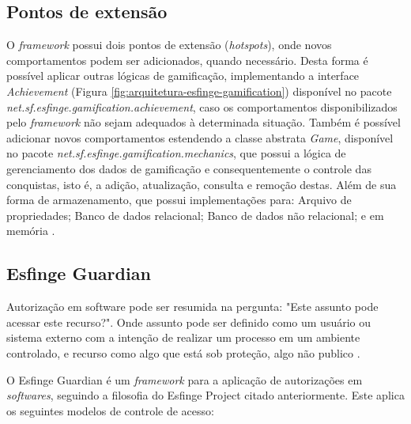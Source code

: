 \subsection{Pontos de extensão}

O \textit{framework} possui dois pontos de extensão (\textit{hotspots}), onde novos comportamentos podem ser adicionados, quando necessário. Desta forma é possível aplicar outras lógicas de gamificação, implementando a interface \textit{Achievement} (Figura \ref{fig:arquitetura-esfinge-gamification}) disponível no pacote \textit{net.sf.esfinge.gamification.achievement}, caso os comportamentos disponibilizados pelo \textit{framework} não sejam adequados \`a determinada situação. Também é possível adicionar novos comportamentos estendendo a classe abstrata \textit{Game}, disponível no pacote \textit{net.sf.esfinge.gamification.mechanics}, que possui a lógica de gerenciamento dos dados de gamificação e consequentemente o controle das conquistas, isto é, a adição, atualização, consulta e remoção destas. Além de sua forma de armazenamento, que possui implementações para: Arquivo de propriedades; Banco de dados relacional; Banco de dados não relacional; e em memória \cite{esfinge2011}.


\subsection{Esfinge Guardian}

\par Autorização em software pode ser resumida na pergunta: "Este assunto pode acessar este recurso?". Onde assunto pode ser definido como um usuário ou sistema externo com a intenção de realizar um processo em um ambiente controlado, e recurso como algo que está sob proteção, algo não publico \cite{bartsch2011authorization}.
\par O Esfinge Guardian é um \textit{framework} para a aplicação de autorizações em \textit{softwares}, seguindo a filosofia do Esfinge Project citado anteriormente. Este aplica os seguintes modelos de controle de acesso:

